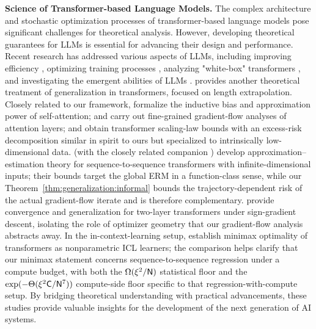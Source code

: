 \documentclass[11pt]{article}
\let\citet\citep
\theoremstyle{plain}
\begin{document}
{\bf Science of Transformer-based Language Models. }
The complex architecture and stochastic optimization processes of transformer-based language models pose significant challenges for theoretical analysis. However, developing theoretical guarantees for LLMs is essential for advancing their design and performance. Recent research has addressed various aspects of LLMs, including improving efficiency \citep{as23, as24_fine_grained, as24_iclr, hjk+23, kmz23, alsy23, dsy24, smn+24, lssy25}, optimizing training processes \citep{dls23, csy24, gll+24}, analyzing "white-box" transformers \citep{ybp+23, yct+23, fsb+24, pbw+24}, and investigating the emergent abilities of LLMs \citep{bmr+20, wtb+22, azl23_physics_a, azl23_physics_b, azl23_physics_c, azl24_physics_d}. \citet{huang2024formal} provides another theoretical treatment of generalization in transformers, focused on length extrapolation. Closely related to our framework, \citet{egkz22} formalize the inductive bias and approximation power of self-attention; \citet{cxl+24} and \citet{nlb24} carry out fine-grained gradient-flow analyses of attention layers; and \citet{havrilla2024understanding} obtain transformer scaling-law bounds with an excess-risk decomposition similar in spirit to ours but specialized to intrinsically low-dimensional data. \citet{ts23_approx_est} (with the closely related companion \citep{ts23_approx_tools}) develop approximation--estimation theory for sequence-to-sequence transformers with infinite-dimensional inputs; their bounds target the global ERM in a function-class sense, while our Theorem~\ref{thm:generalization:informal} bounds the trajectory-dependent risk of the actual gradient-flow iterate and is therefore complementary. \citet{lhh+24_sign_gd} provide convergence and generalization for two-layer transformers under sign-gradient descent, isolating the role of optimizer geometry that our gradient-flow analysis abstracts away. In the in-context-learning setup, \citet{ks24_minimax_icl} establish minimax optimality of transformers as nonparametric ICL learners; the comparison helps clarify that our minimax statement concerns sequence-to-sequence regression under a compute budget, with both the $\Omega(\xi^2/{\sf N})$ statistical floor and the $\exp(-\Theta(\xi^2{\sf C}/{\sf N}^7))$ compute-side floor specific to that regression-with-compute setup. By bridging theoretical understanding with practical advancements, these studies provide valuable insights for the development of the next generation of AI systems.%
\fi
\end{document}
